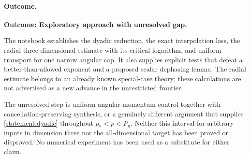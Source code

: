 \documentclass[11pt]{article}
\begin{document}
	\paragraph{Outcome.}
	\textbf{Outcome: Exploratory approach with unresolved gap.}
	
	The notebook establishes the dyadic reduction, the exact interpolation
	loss, the radial three-dimensional estimate with its critical logarithm,
	and uniform transport for one narrow angular cap. It also supplies
	explicit tests that defeat a better-than-allowed exponent and a proposed
	scalar dephasing lemma. The radial estimate belongs to an already known
	special-case theory; these calculations are not advertised as a new
	advance in the unrestricted frontier.
	
	The unresolved step is uniform angular-momentum control together with
	cancellation-preserving synthesis, or a genuinely different argument
	that supplies \eqref{statement:dyadic} throughout
	$p_*<p<P_n$. Neither this interval for arbitrary inputs in dimension
	three nor the all-dimensional target has been proved or disproved.
	No numerical experiment has been used as a substitute for either claim.
\end{document}
